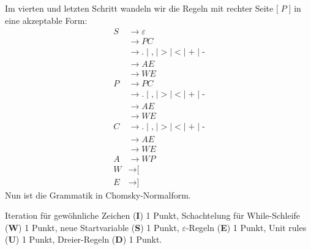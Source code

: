 \begin{loesung}
Im vierten und letzten Schritt wandeln wir die Regeln mit rechter Seite
$\texttt{[}\;P\;\texttt{]}$ in eine akzeptable Form:
\begin{align*}
S&\rightarrow\varepsilon
\\
&\rightarrow P C
\\
&\rightarrow
\texttt{.} \mid 
\texttt{,} \mid 
\texttt{>} \mid 
\texttt{<} \mid 
\texttt{+} \mid 
\texttt{-}
\\
&\rightarrow AE
\\
&\rightarrow WE
\\
P&\rightarrow P C
\\
&\rightarrow
\texttt{.} \mid 
\texttt{,} \mid 
\texttt{>} \mid 
\texttt{<} \mid 
\texttt{+} \mid 
\texttt{-}
\\
&\rightarrow AE
\\
&\rightarrow WE
\\
C&\rightarrow
\texttt{.} \mid 
\texttt{,} \mid 
\texttt{>} \mid 
\texttt{<} \mid 
\texttt{+} \mid 
\texttt{-}
\\
&\rightarrow AE
\\
&\rightarrow WE
\\
A&\rightarrow W P
\\
W&\rightarrow\texttt{[}
\\
E&\rightarrow\texttt{]}
\end{align*}
Nun ist die Grammatik in Chomsky-Normalform.
\end{loesung}

\begin{bewertung}
Iteration für gewöhnliche Zeichen ({\bf I}) 1 Punkt,
Schachtelung für While-Schleife ({\bf W}) 1 Punkt,
neue Startvariable ({\bf S}) 1 Punkt,
$\varepsilon$-Regeln ({\bf E}) 1 Punkt,
Unit rules ({\bf U}) 1 Punkt,
Dreier-Regeln ({\bf D}) 1 Punkt.
\end{bewertung}

